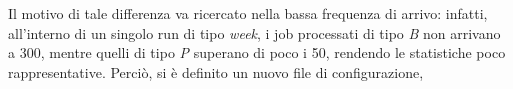 \documentclass[a4paper, 12pt]{article}
\begin{document}
%

Il motivo di tale differenza va ricercato nella bassa frequenza di arrivo: infatti, all'interno di un singolo run di tipo \textit{week}, i job processati di tipo \textit{B} non arrivano a 300, mentre quelli di tipo \textit{P} superano di poco i 50, rendendo le statistiche poco rappresentative. Perciò, si è definito un nuovo file di configurazione, 

\end{document}
